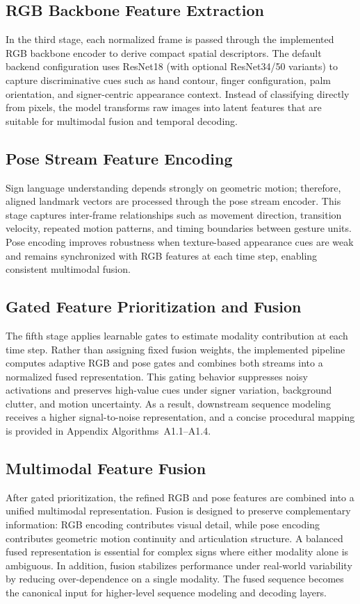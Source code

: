 \subsection{RGB Backbone Feature Extraction}
In the third stage, each normalized frame is passed through the implemented RGB backbone encoder to derive compact spatial descriptors. The default backend configuration uses ResNet18 (with optional ResNet34/50 variants) to capture discriminative cues such as hand contour, finger configuration, palm orientation, and signer-centric appearance context. Instead of classifying directly from pixels, the model transforms raw images into latent features that are suitable for multimodal fusion and temporal decoding.

\subsection{Pose Stream Feature Encoding}
Sign language understanding depends strongly on geometric motion; therefore, aligned landmark vectors are processed through the pose stream encoder. This stage captures inter-frame relationships such as movement direction, transition velocity, repeated motion patterns, and timing boundaries between gesture units. Pose encoding improves robustness when texture-based appearance cues are weak and remains synchronized with RGB features at each time step, enabling consistent multimodal fusion.

\subsection{Gated Feature Prioritization and Fusion}
The fifth stage applies learnable gates to estimate modality contribution at each time step. Rather than assigning fixed fusion weights, the implemented pipeline computes adaptive RGB and pose gates and combines both streams into a normalized fused representation. This gating behavior suppresses noisy activations and preserves high-value cues under signer variation, background clutter, and motion uncertainty. As a result, downstream sequence modeling receives a higher signal-to-noise representation, and a concise procedural mapping is provided in Appendix Algorithms~A1.1--A1.4.

\subsection{Multimodal Feature Fusion}
After gated prioritization, the refined RGB and pose features are combined into a unified multimodal representation. Fusion is designed to preserve complementary information: RGB encoding contributes visual detail, while pose encoding contributes geometric motion continuity and articulation structure. A balanced fused representation is essential for complex signs where either modality alone is ambiguous. In addition, fusion stabilizes performance under real-world variability by reducing over-dependence on a single modality. The fused sequence becomes the canonical input for higher-level sequence modeling and decoding layers.

